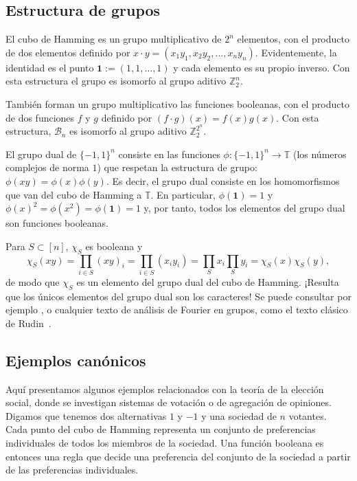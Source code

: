 \documentclass[autocontact]{gaceta}
\newcommand{\Z}{\mathbb{Z}}
\begin{document}
\subsection{Estructura de grupos}

El cubo de Hamming es un grupo multiplicativo de $2^n$ elementos, con el producto de dos elementos definido por $x\cdot y = (x_1y_1,x_2y_2,\dots,x_ny_n)$. Evidentemente, la identidad es el punto $\mathbf{1}:=(1,1,\dots, 1)$ y cada elemento es su propio inverso. Con esta estructura el grupo es isomorfo al grupo aditivo $\Z_2^n$.

También forman un grupo multiplicativo las funciones booleanas, con el producto de dos funciones $f$ y $g$ definido por $(f\cdot g)(x) = f(x)g(x)$. Con esta estructura, $\mathcal{B}_n$ es isomorfo al grupo aditivo $\Z_2^{2^n}$.

El grupo dual de $\{-1,1\}^{n}$ consiste en las funciones $\phi: \{-1,1\}^{n} \to \mathbb{T}$ (los números complejos de norma $1$) que respetan la estructura de grupo: $\phi(xy)=\phi(x)\phi(y)$. Es decir, el grupo dual consiste en los homomorfismos que van del cubo de Hamming a $\mathbb{T}$. En particular, $\phi(\mathbf{1})=1$ y $\phi(x)^2=\phi(x^2)=\phi(\mathbf{1})=1$ y, por tanto, todos los elementos del grupo dual son funciones booleanas.

Para $S\subset [n]$, $\chi_S$ es booleana y
\[
   \chi_S(xy)
   =\prod_{i\in S} (xy)_i
   = \prod_{i\in S} (x_iy_i)
   = \prod_S x_i  \prod_S y_i
   = \chi_S(x) \chi_S(y),
\]
de modo que $\chi_S$ es un elemento del grupo dual del cubo de Hamming. ¡Resulta que los únicos elementos del grupo dual son los caracteres! Se puede consultar por ejemplo \cite[sección 8.5]{O'Do21}, o cualquier texto de análisis de Fourier en grupos, como el texto clásico de Rudin~\cite[capítulo 1]{Ru62}.

\subsection{Ejemplos canónicos}\label{sec:canonical-examples}

Aquí presentamos algunos ejemplos relacionados con la teoría de la elección social, donde se investigan sistemas de votación o de agregación de opiniones. Digamos que tenemos dos alternativas $1$ y $-1$ y una sociedad de $n$ votantes. Cada punto del cubo de Hamming representa un conjunto de preferencias individuales de todos los miembros de la sociedad. Una función booleana es entonces una regla que decide una preferencia del conjunto de la sociedad a partir de las preferencias individuales.
\end{document}
